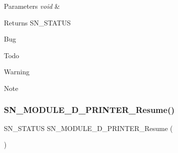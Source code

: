 \begin{DoxyParams}{Parameters}
{\em void} & \\
\hline
\end{DoxyParams}
\begin{DoxyReturn}{Returns}
S\+N\+\_\+\+S\+T\+A\+T\+US 
\end{DoxyReturn}
\begin{DoxyRefDesc}{Bug}
\item[\hyperlink{bug__bug000006}{Bug}]\end{DoxyRefDesc}
\begin{DoxyRefDesc}{Todo}
\item[\hyperlink{todo__todo000006}{Todo}]\end{DoxyRefDesc}
\begin{DoxyWarning}{Warning}

\end{DoxyWarning}
\begin{DoxyNote}{Note}

\end{DoxyNote}
\mbox{\label{group__D_gaabec8b5f01119d989d725eff26053ca5}} 
\subsubsection{\texorpdfstring{S\+N\+\_\+\+M\+O\+D\+U\+L\+E\+\_\+D\+\_\+\+P\+R\+I\+N\+T\+E\+R\+\_\+\+Resume()}{SN\_MODULE\_3D\_PRINTER\_Resume()}}
{\footnotesize\ttfamily S\+N\+\_\+\+S\+T\+A\+T\+US S\+N\+\_\+\+M\+O\+D\+U\+L\+E\+\_\+D\+\_\+\+P\+R\+I\+N\+T\+E\+R\+\_\+\+Resume (\begin{DoxyParamCaption}\item[{void}]{ }\end{DoxyParamCaption})}


